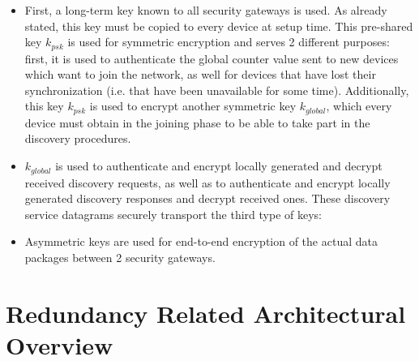 \begin{itemize}
 \item First, a long-term key known to all security gateways is used. As already stated, this key must be copied to every device at setup time. 
This pre-shared key $k_{psk}$ is used for symmetric encryption and serves 2 different purposes: first, it is used to authenticate the global counter
value sent to  new devices which want to join the network, as well for devices that have lost their synchronization (i.e. that have been unavailable for some
 time). Additionally, this key $k_{psk}$ is used to encrypt another symmetric key $k_{global}$, which every device must obtain in the joining phase to be 
 able to take part in the discovery procedures. 
 \item $k_{global}$ is used to authenticate and encrypt locally generated and decrypt received discovery requests, as well as to authenticate and encrypt
 locally generated discovery responses and decrypt received ones. These discovery service datagrams securely transport the third type of keys:
 \item Asymmetric keys are used for end-to-end encryption of the actual data packages between 2 security gateways.
\end{itemize}


\section{Redundancy Related Architectural Overview}

